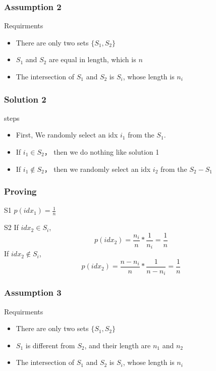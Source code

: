 \documentclass[notheorems, aspectratio=54]{beamer}
\begin{document}
\begin{frame}
    \frametitle{Assumption 2}
    \begin{block}{Requirments}
        \begin{itemize}
            \item There are only two sets $\{S_1, S_2\}$
            \item $S_1$ and $S_2$ are equal in length, which is $n$
            \item The intersection of $S_1$ and $S_2$ is $S_i$, whose length is $n_i$
        \end{itemize}
    \end{block}
\end{frame}
\begin{frame}
    \frametitle{Solution 2}
    \begin{block}{steps}
        \begin{itemize}
            \item First, We randomly select an idx $i_1$ from the $S_1$.
            \item If $i_1 \in S_2$， then we do nothing like solution 1
            \item If $i_1 \notin S_2$， then we randomly select an idx $i_2$ from the $S_2-S_1$
        \end{itemize}
    \end{block}
\end{frame}
\begin{frame}
    \frametitle{Proving}
    \begin{block}{S1}
        $p(idx_1) = \frac{1}{n}$
    \end{block}
    \begin{block}{S2}
        If $idx_2 \in S_i$, 
        $$
            p(idx_2) = \frac{n_i}{n}*\frac{1}{n_i} = \frac{1}{n}
        $$
        If $idx_2 \notin S_i$, 
        $$
            p(idx_2) = \frac{n-n_i}{n}*\frac{1}{n-n_i} = \frac{1}{n}
        $$
    \end{block}
\end{frame}

\begin{frame}
    \frametitle{Assumption 3}
    \begin{block}{Requirments}
        \begin{itemize}
            \item There are only two sets $\{S_1, S_2\}$
            \item $S_1$ is different from $S_2$, and their length are $n_1$ and $n_2$
            \item The intersection of $S_1$ and $S_2$ is $S_i$, whose length is $n_i$
        \end{itemize}
    \end{block}
\end{frame}
\end{document}
